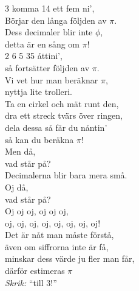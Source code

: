 \documentclass[a6paper,10pt]{article}
\begin{document}
\begin{center}
\end{center}
\begin{lyrics}
3 komma 14 ett fem ni',\\
Börjar den långa följden av $\pi$.\\
Dess decimaler blir inte $\phi$,\\
detta är en sång om $\pi$!
\vspace{5pt}\\
2 6 5 35 åttini',\\
så fortsätter följden av $\pi$.\\
Vi vet hur man beräknar $\pi$,\\
nyttja lite trolleri.
\vspace{5pt}\\
Ta en cirkel och mät runt den,\\
dra ett streck tvärs över ringen,\\
dela dessa så får du nåntin’\\
så kan du beräkna $\pi$!
\vspace{5pt}\\
Men då,\\
vad står på?\\
Decimalerna blir bara mera små.\\
Oj då,\\
vad står på?\\
Oj oj oj, oj oj oj,\\
oj, oj, oj, oj, oj, oj, oj, oj!
\vspace{5pt}\\
Det är nåt man måste förstå,\\
även om siffrorna inte är få,\\
minskar dess värde ju fler man får,\\
därför estimeras $\pi$ 
\vspace{5pt}\\
\textit{Skrik:} “till 3!”
\end{lyrics}

\setlength{\oddsidemargin}{-0.47in}
\end{document}
